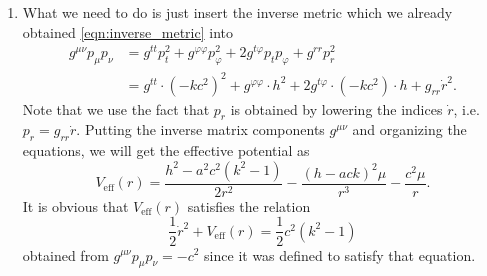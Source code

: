 \documentclass[a4paper,pdftex,10pt]{article}
\begin{document}
\begin{enumerate}
        \item 

        What we need to do is just insert the inverse metric which we already obtained \eqref{eqn:inverse_metric} into
        \begin{align}
          g^{\mu\nu}p_{\mu}p_{\nu}
          &=
          g^{tt}p_{t}^2
          +
          g^{\varphi\varphi}p_{\varphi}^2
          +
          2g^{t\varphi}p_{t}p_{\varphi}
          +
          g^{rr}p_{r}^2
          \nonumber
          \\
          &=
          g^{tt}\cdot(-kc^2)^2
          +
          g^{\varphi\varphi}\cdot h^2
          +
          2g^{t\varphi}\cdot(-kc^2)\cdot h
          +
          g_{rr}\dot{r}^2
          .
        \end{align}
        Note that we use the fact that $p_{r}$ is obtained by lowering the indices $\dot{r}$, i.e. $p_{r}=g_{rr}\dot{r}$. Putting the inverse matrix components $g^{\mu\nu}$ and organizing the equations, we will get the effective potential as 
        \begin{equation}
          V_{\mathrm{eff}}(r)
          =
          \frac{h^2-a^2c^2(k^2-1)}{2r^2}
          -
          \frac{(h-ack)^2\mu}{r^3}
          -
          \frac{c^2\mu}{r}
          .
        \end{equation}
        It is obvious that $V_{\mathrm{eff}}(r)$ satisfies the relation
        \begin{equation}
          \frac{1}{2}\dot{r}^2
          +
          V_{\mathrm{eff}}(r)
          =
          \frac{1}{2}c^2(k^2-1)
        \end{equation}
        obtained from $g^{\mu\nu}p_{\mu}p_{\nu}=-c^2$ since it was defined to satisfy that equation.



\end{enumerate}
\end{document}
